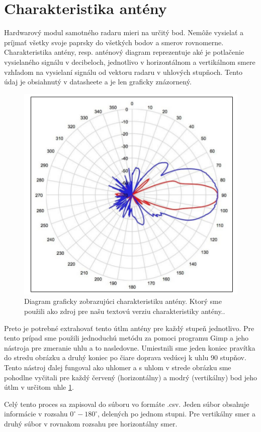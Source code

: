   \section{Charakteristika antény}
    Hardwarový modul samotného radaru mieri na určitý bod. Nemôže vysielať a príjmať všetky svoje paprsky do všetkých bodov a smerov rovnomerne. Charakteristika antény, resp. anténový diagram reprezentuje aké je potlačenie vysielaného signálu v decibeloch, jednotlivo v horizontálnom a vertikálnom smere vzhľadom na vysielaní signálu od vektoru radaru v uhlových stupňoch. Tento údaj je obsiahnutý v datasheete a je len graficky znázornený.

    \begin{figure}[h]
        \centering
        \includegraphics[width=.7\textwidth]{obrazky-figures/kmc4_antenna_char.png}
        \caption{Diagram graficky zobrazujúci charakteristiku antény. Ktorý sme použili ako zdroj pre našu textovú verziu charakteristiky antény.\cite{kmc4sheet}.}
        \label{fig:kmc4_antenna_char}
    \end{figure}

    Preto je potrebné extrahovať tento útlm antény pre každý stupeň jednotlivo. Pre tento prípad sme použili jednoduchú metódu za pomoci programu Gimp a jeho nástroja pre zmeranie uhlu a to nasledovne. Umiestnili sme jeden koniec pravítka do stredu obrázku a druhý koniec po čiare doprava vedúcej k uhlu 90 stupňov. Tento nástroj ďalej fungoval ako uhlomer a s uhlom v strede obrázku sme pohodlne vyčitali pre každý červený (horizontálny) a modrý (vertikálny) bod jeho útlm v určitom uhle \ref{fig:kmc4_antenna_char}.

    Celý tento proces sa zapisoval do súboru vo formáte .csv. Jeden súbor obsahuje informácie v rozsahu $0^{\circ}-180^{\circ}$, delených po jednom stupni. Pre vertikálny smer a druhý súbor v rovnakom rozsahu pre horizontálny smer.

